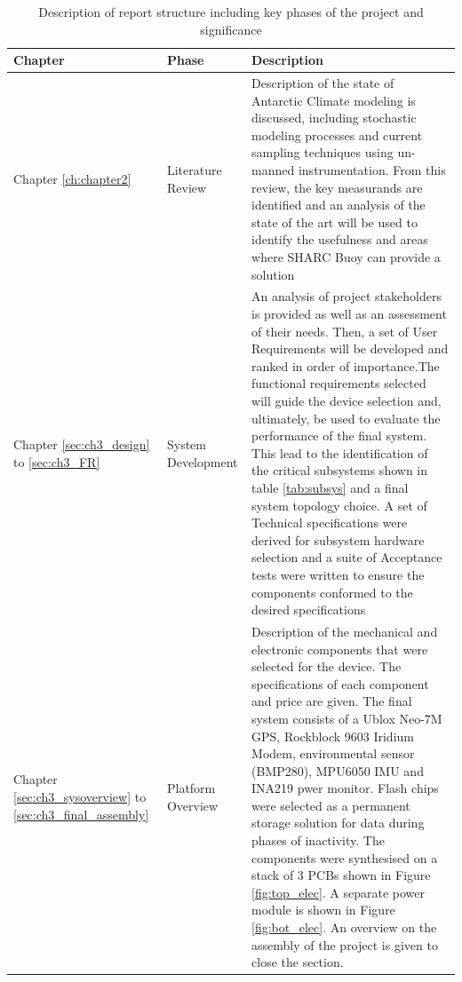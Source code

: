 \begin{center}
   {\setlength{\extrarowheight}{5pt}%
    \begin{longtable}[H]{|>{\RaggedRight}m{}| >{\centering}m{} | 
   m{}|}
        \caption{Description of report structure including key phases of the project and
        significance}
        \label{tab:report_structure}\\
        \hline
        \textbf{Chapter} & \textbf{Phase} & \textbf{Description} \\
        \hline
        Chapter \ref{ch:chapter2} & Literature Review & Description of the state of Antarctic Climate modeling is discussed, including stochastic modeling processes and current sampling techniques using un-manned instrumentation. From this review, the key measurands are identified and an analysis of the state of the art will be used to identify the usefulness and areas where SHARC Buoy can provide a solution \\
        \hline
        Chapter \ref{sec:ch3_design} to \ref{sec:ch3_FR} &System Development &  An analysis of project stakeholders is provided as well as an assessment of their needs. Then, a set of User Requirements will be developed and ranked in order of importance.The functional requirements selected will guide the device selection and, ultimately, be used to evaluate the performance of the final system. This lead to the identification of the critical subsystems shown in table \ref{tab:subsys} and a final system topology choice. A set of Technical specifications were derived for subsystem hardware selection and a suite of Acceptance tests were written to ensure the components conformed to the desired specifications\\
        \hline
        Chapter \ref{sec:ch3_sysoverview} to \ref{sec:ch3_final_assembly} & Platform Overview & Description of the mechanical and electronic components that were selected for the device. The specifications of each component and price are given. The final system consists of a Ublox Neo-7M GPS, Rockblock 9603 Iridium Modem, environmental sensor (BMP280), MPU6050 IMU and INA219 pwer monitor. Flash chips were selected as a permanent storage solution for data during phases of inactivity. The components were synthesised on a stack of 3 PCBs shown in Figure \ref{fig:top_elec}. A separate power module is shown in Figure \ref{fig:bot_elec}. An overview on the assembly of the project is given to close the section.\\
        \hline

\end{longtable}}
\end{center}
